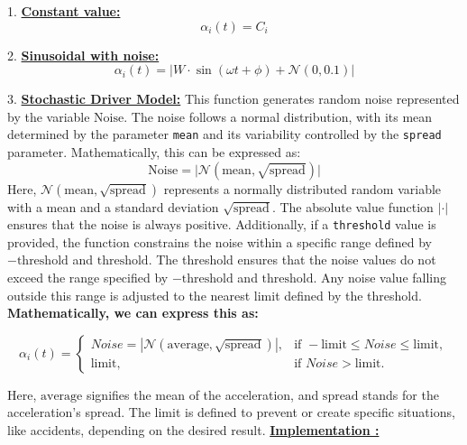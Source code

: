 \documentclass{article}
\begin{document}
			1. \textbf{\underline{Constant value:}}
			\[
			\alpha_i(t) = C_i
			\]
			
			2. \textbf{\underline{Sinusoidal with noise:}}
			\[
			\alpha_i(t) = \left| W \cdot \sin(\omega t + \phi) + \mathcal{N}(0, 0.1) \right|
			\]
			
			3. \textbf{\underline{Stochastic Driver Model:}} \newline \newline
			This function generates random noise represented by the variable \( \text{Noise} \). The noise follows a normal distribution, with its mean determined by the parameter \texttt{mean} and its variability controlled by the \texttt{spread} parameter. Mathematically, this can be expressed as:
			\[ \text{Noise} = \lvert \mathcal{N}(\text{mean}, \sqrt{\text{spread}}) \rvert \]
			Here, \( \mathcal{N}(\text{mean}, \sqrt{\text{spread}}) \) represents a normally distributed random variable with a mean  and a standard deviation \( \sqrt{\text{spread}} \). The absolute value function \( \lvert \cdot \rvert \) ensures that the noise is always positive. Additionally, if a \texttt{threshold} value is provided, the function constrains the noise within a specific range defined by \( -\text{threshold} \) and \( \text{threshold} \).  The threshold ensures that the noise values do not exceed the range specified by \( -\text{threshold} \) and \( \text{threshold} \). Any noise value falling outside this range is adjusted to the nearest limit defined by the threshold. \newline \newline \textbf{Mathematically, we can express this as:}
		
			
			\[
			\alpha_i(t) =
			\begin{cases}
				 Noise = \left| \mathcal{N}(\text{average}, \sqrt{\text{spread}}) \right|, & \text{if } -\text{limit} \leq Noise \leq \text{limit}, \\
				\text{limit}, & \text{if } Noise > \text{limit}.
			\end{cases}
			\]
			
			Here, \( \text{average} \) signifies the mean of the acceleration, and \( \text{spread} \) stands for the acceleration's spread. The limit is defined to prevent or create specific situations, like accidents, depending on the desired result. \newpage \textbf{\underline{Implementation : }}
			
\end{document}

